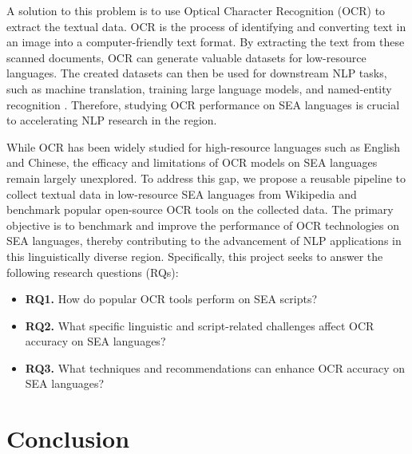 \documentclass[12pt,oneside]{memoir}
\begin{document}
A solution to this problem is to use Optical Character Recognition (OCR) to extract the textual data.
OCR is the process of identifying and converting text in an image into a computer-friendly text format.
By extracting the text from these scanned documents, OCR can generate valuable datasets for low-resource languages.
The created datasets can then be used for downstream NLP tasks, such as machine translation, training large language models, and named-entity recognition \parencite{agarwal-and-anastasopoulos-2024, ignat-etal-2022}.
Therefore, studying OCR performance on SEA languages is crucial to accelerating NLP research in the region.

While OCR has been widely studied for high-resource languages such as English and Chinese, the efficacy and limitations of OCR models on SEA languages remain largely unexplored.
To address this gap, we propose a reusable pipeline to collect textual data in low-resource SEA languages from Wikipedia and benchmark popular open-source OCR tools on the collected data.
The primary objective is to benchmark and improve the performance of OCR technologies on SEA languages, thereby contributing to the advancement of NLP applications in this linguistically diverse region.
Specifically, this project seeks to answer the following research questions (RQs):

\begin{itemize}
    \item \textbf{RQ1.} How do popular OCR tools perform on SEA scripts?
    \item \textbf{RQ2.} What specific linguistic and script-related challenges affect OCR accuracy on SEA languages?
    \item \textbf{RQ3.} What techniques and recommendations can enhance OCR accuracy on SEA languages?
\end{itemize}

\chapter{Conclusion}
\end{document}
